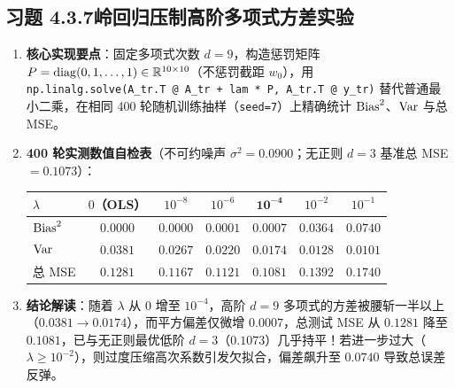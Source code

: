 \subsection*{习题 4.3.7\quad 岭回归压制高阶多项式方差实验}
\begin{enumerate}[label=(\arabic*), leftmargin=1.8em]
  \item \textbf{核心实现要点}：固定多项式次数 $d = 9$，构造惩罚矩阵 $P = \operatorname{diag}(0, 1, \dots, 1) \in \mathbb{R}^{10\times 10}$（不惩罚截距 $w_0$），用 \texttt{np.linalg.solve(A\_tr.T @ A\_tr + lam * P, A\_tr.T @ y\_tr)} 替代普通最小二乘，在相同 400 轮随机训练抽样（\texttt{seed=7}）上精确统计 $\operatorname{Bias}^2$、$\operatorname{Var}$ 与总 MSE。
  \item \textbf{400 轮实测数值自检表}（不可约噪声 $\sigma^2 = 0.0900$；无正则 $d=3$ 基准总 MSE $= 0.1073$）：
  \begin{center}\small
  \begin{tabular}{@{}lcccccc@{}}
    \toprule
    $\lambda$ & $0$（OLS） & $10^{-8}$ & $10^{-6}$ & $\mathbf{10^{-4}}$ & $10^{-2}$ & $10^{-1}$ \\
    \midrule
    $\operatorname{Bias}^2$ & $0.0000$ & $0.0000$ & $0.0001$ & $\mathbf{0.0007}$ & $0.0364$ & $0.0740$ \\
    $\operatorname{Var}$ & $0.0381$ & $0.0267$ & $0.0220$ & $\mathbf{0.0174}$ & $0.0128$ & $0.0101$ \\
    总 MSE & $0.1281$ & $0.1167$ & $0.1121$ & $\mathbf{0.1081}$ & $0.1392$ & $0.1740$ \\
    \bottomrule
  \end{tabular}
  \end{center}
  \item \textbf{结论解读}：随着 $\lambda$ 从 $0$ 增至 $10^{-4}$，高阶 $d=9$ 多项式的方差被腰斩一半以上（$0.0381 \to 0.0174$），而平方偏差仅微增 $0.0007$，总测试 MSE 从 $0.1281$ 降至 $\mathbf{0.1081}$，已与无正则最优低阶 $d=3$（$0.1073$）几乎持平！若进一步过大（$\lambda \ge 10^{-2}$），则过度压缩高次系数引发欠拟合，偏差飙升至 $0.0740$ 导致总误差反弹。
\end{enumerate}

